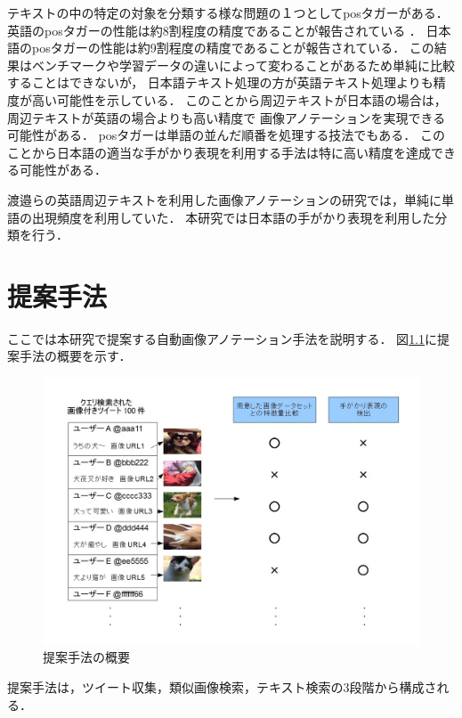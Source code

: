 テキストの中の特定の対象を分類する様な問題の１つとしてposタガーがある．
英語のposタガーの性能は約8割程度の精度であることが報告されている
\cite{BirdKleinLoper09}
．
日本語のposタガーの性能は約9割程度の精度であることが報告されている\cite{UniDicJp2010}．
この結果はベンチマークや学習データの違いによって変わることがあるため単純に比較することはできないが，
日本語テキスト処理の方が英語テキスト処理よりも精度が高い可能性を示している．
このことから周辺テキストが日本語の場合は，周辺テキストが英語の場合よりも高い精度で
画像アノテーションを実現できる可能性がある．
posタガーは単語の並んだ順番を処理する技法でもある．
このことから日本語の適当な手がかり表現を利用する手法は特に高い精度を達成できる可能性がある．

渡邉ら\cite{watanabe}の英語周辺テキストを利用した画像アノテーションの研究では，単純に単語の出現頻度を利用していた．
本研究では日本語の手がかり表現を利用した分類を行う．



\chapter{提案手法}
\label{sec:way}

ここでは本研究で提案する自動画像アノテーション手法を説明する．
図\ref{fig:way}に提案手法の概要を示す．
%
\begin{figure}[tb]
 \begin{center}
  \includegraphics[scale=0.50]{way.jpg}
 \end{center}
 \caption{提案手法の概要}
 \label{fig:way}
\end{figure}
%
提案手法は，ツイート収集，類似画像検索，テキスト検索の3段階から構成される．


